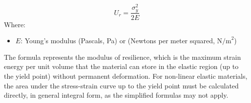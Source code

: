 \documentclass{article}
\begin{document}
{\begin{equation}
    U_r = \frac{\sigma_y^2}{2E}
\end{equation}
Where:
\begin{itemize}[itemsep=-1mm]
    \item \( E \): {Young's modulus} (Pascals, Pa) or (Newtons per meter squared, \( \text{N/m}^2 \))
\end{itemize}
The formula represents the modulus of resilience, which is the maximum strain energy per unit volume that the material can store in the elastic region (up to the yield point) without permanent deformation. For non-linear elastic materials, the area under the stress-strain curve up to the yield point must be calculated directly, in general integral form, as the simplified formulas may not apply.

\newpage    

}
\end{document}
